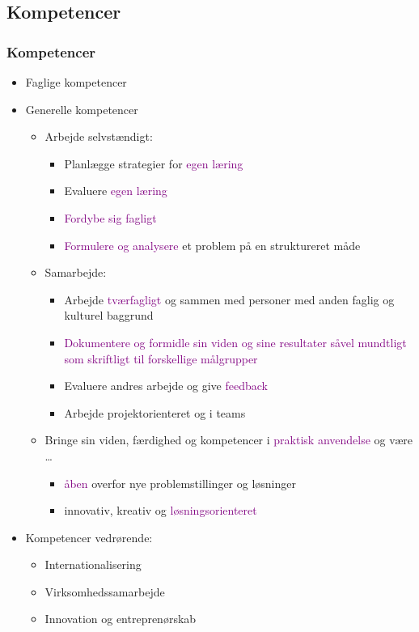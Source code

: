 {\subsection{Kompetencer}
\begin{frame}[fragile]
  \frametitle{Kompetencer}
  \vspace{-3mm}
  \begin{itemize}
    \pause
    \item Faglige kompetencer
    \pause
    \item Generelle kompetencer
      \begin{itemize}
        \pause
        \item Arbejde selvstændigt:
          \begin{itemize}
            \item Planlægge strategier for \textcolor{purple}{egen læring}
            \item Evaluere \textcolor{purple}{egen læring}
            \item \textcolor{purple}{Fordybe sig fagligt}
            \item \textcolor{purple}{Formulere og analysere} et problem på en struktureret måde
          \end{itemize}
        \pause
        \item Samarbejde:
          \begin{itemize}
            \item Arbejde \textcolor{purple}{tværfagligt} og sammen med personer med anden faglig og kulturel
baggrund
            \item \textcolor{purple}{Dokumentere og formidle sin viden og sine resultater såvel
mundtligt som skriftligt til forskellige målgrupper}
            \item Evaluere andres arbejde og give \textcolor{purple}{feedback}
            \item Arbejde projektorienteret og i teams
          \end{itemize}
        \pause
        \item Bringe sin viden, færdighed og kompetencer i \textcolor{purple}{praktisk anvendelse} og være \ldots
          \begin{itemize}
            \item \textcolor{purple}{åben} overfor nye problemstillinger og løsninger
            \item innovativ, kreativ og \textcolor{purple}{løsningsorienteret}
          \end{itemize}
      \end{itemize}
    \pause
    \item Kompetencer vedrørende:
      \begin{itemize}
        \item Internationalisering
        \item Virksomhedssamarbejde
        \item Innovation og entreprenørskab
      \end{itemize}
  \end{itemize}
\end{frame}

}
